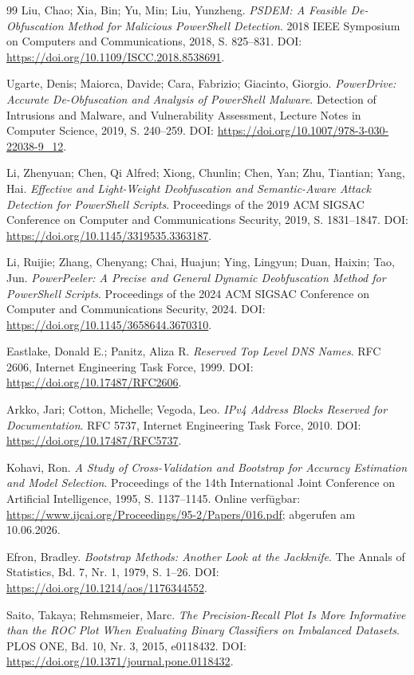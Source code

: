 \documentclass[12pt,a4paper,oneside,parskip=half]{scrreprt}
\begin{document}
\begin{thebibliography}{99}
Liu, Chao; Xia, Bin; Yu, Min; Liu, Yunzheng. \emph{PSDEM: A Feasible De-Obfuscation Method for Malicious PowerShell Detection}. 2018 IEEE Symposium on Computers and Communications, 2018, S. 825--831. DOI: \url{https://doi.org/10.1109/ISCC.2018.8538691}.

Ugarte, Denis; Maiorca, Davide; Cara, Fabrizio; Giacinto, Giorgio. \emph{PowerDrive: Accurate De-Obfuscation and Analysis of PowerShell Malware}. Detection of Intrusions and Malware, and Vulnerability Assessment, Lecture Notes in Computer Science, 2019, S. 240--259. DOI: \url{https://doi.org/10.1007/978-3-030-22038-9_12}.

Li, Zhenyuan; Chen, Qi Alfred; Xiong, Chunlin; Chen, Yan; Zhu, Tiantian; Yang, Hai. \emph{Effective and Light-Weight Deobfuscation and Semantic-Aware Attack Detection for PowerShell Scripts}. Proceedings of the 2019 ACM SIGSAC Conference on Computer and Communications Security, 2019, S. 1831--1847. DOI: \url{https://doi.org/10.1145/3319535.3363187}.

Li, Ruijie; Zhang, Chenyang; Chai, Huajun; Ying, Lingyun; Duan, Haixin; Tao, Jun. \emph{PowerPeeler: A Precise and General Dynamic Deobfuscation Method for PowerShell Scripts}. Proceedings of the 2024 ACM SIGSAC Conference on Computer and Communications Security, 2024. DOI: \url{https://doi.org/10.1145/3658644.3670310}.

Eastlake, Donald E.; Panitz, Aliza R. \emph{Reserved Top Level DNS Names}. RFC 2606, Internet Engineering Task Force, 1999. DOI: \url{https://doi.org/10.17487/RFC2606}.

Arkko, Jari; Cotton, Michelle; Vegoda, Leo. \emph{IPv4 Address Blocks Reserved for Documentation}. RFC 5737, Internet Engineering Task Force, 2010. DOI: \url{https://doi.org/10.17487/RFC5737}.

Kohavi, Ron. \emph{A Study of Cross-Validation and Bootstrap for Accuracy Estimation and Model Selection}. Proceedings of the 14th International Joint Conference on Artificial Intelligence, 1995, S. 1137--1145. Online verfügbar: \url{https://www.ijcai.org/Proceedings/95-2/Papers/016.pdf}; abgerufen am 10.06.2026.

Efron, Bradley. \emph{Bootstrap Methods: Another Look at the Jackknife}. The Annals of Statistics, Bd. 7, Nr. 1, 1979, S. 1--26. DOI: \url{https://doi.org/10.1214/aos/1176344552}.

Saito, Takaya; Rehmsmeier, Marc. \emph{The Precision-Recall Plot Is More Informative than the ROC Plot When Evaluating Binary Classifiers on Imbalanced Datasets}. PLOS ONE, Bd. 10, Nr. 3, 2015, e0118432. DOI: \url{https://doi.org/10.1371/journal.pone.0118432}.

\end{thebibliography}
\end{document}
